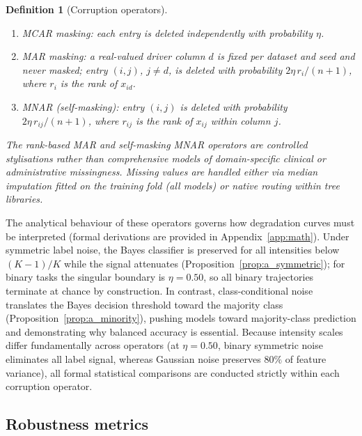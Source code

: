 \documentclass[pdflatex,sn-mathphys]{sn-jnl}
\theoremstyle{thmstyleone}
\theoremstyle{thmstyletwo}
\theoremstyle{thmstylethree}
\newtheorem{definition}{Definition}
\begin{document}
\begin{definition}[Corruption operators]
\begin{enumerate}
\item \emph{MCAR masking}: each entry is deleted independently with probability $\eta$.
\item \emph{MAR masking}: a real-valued driver column $d$ is fixed per dataset and seed and never masked; entry $(i,j)$, $j\neq d$, is deleted with probability $2\eta\,r_i/(n+1)$, where $r_i$ is the rank of $x_{id}$.
\item \emph{MNAR (self-masking)}: entry $(i,j)$ is deleted with probability $2\eta\,r_{ij}/(n+1)$, where $r_{ij}$ is the rank of $x_{ij}$ within column $j$.
\end{enumerate}
The rank-based MAR and self-masking MNAR operators are controlled stylisations rather than comprehensive models of domain-specific clinical or administrative missingness. Missing values are handled either via median imputation fitted on the training fold (all models) or native routing within tree libraries.
\end{definition}

The analytical behaviour of these operators governs how degradation curves must be interpreted (formal derivations are provided in Appendix~\ref{app:math}). Under symmetric label noise, the Bayes classifier is preserved for all intensities below $(K-1)/K$ while the signal attenuates (Proposition~\ref{prop:a_symmetric}); for binary tasks the singular boundary is $\eta=0.50$, so all binary trajectories terminate at chance by construction. In contrast, class-conditional noise translates the Bayes decision threshold toward the majority class (Proposition~\ref{prop:a_minority}), pushing models toward majority-class prediction and demonstrating why balanced accuracy is essential. Because intensity scales differ fundamentally across operators (at $\eta=0.50$, binary symmetric noise eliminates all label signal, whereas Gaussian noise preserves $80\%$ of feature variance), all formal statistical comparisons are conducted strictly within each corruption operator.

\subsection{Robustness metrics}\label{sec:problem:metrics}
\end{document}
